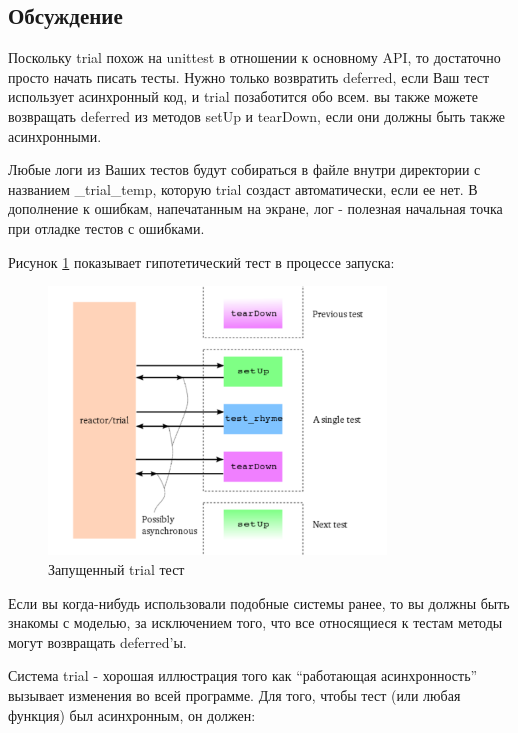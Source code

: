 \subsection{Обсуждение}

Поскольку trial похож на unittest в отношении 
к основному API, то достаточно просто начать писать тесты. 
Нужно только возвратить deferred, если Ваш тест использует 
асинхронный код, и trial позаботится обо всем. вы также можете 
возвращать deferred из методов setUp и tearDown, если 
они должны быть также асинхронными. 


Любые логи из Ваших тестов будут собираться в файле 
внутри директории с названием \_trial\_temp, 
которую trial создаст автоматически, если ее нет. 
В дополнение к ошибкам, напечатанным на экране, 
лог - полезная начальная точка при отладке тестов с ошибками. 

Рисунок \ref{fig:test-1} показывает гипотетический тест в 
процессе запуска:

\begin{figure}[h]
\begin{center}
    \includegraphics[width=0.8\textwidth]{images/test-1.pdf}
    \caption{Запущенный trial тест\label{fig:test-1}}
\end{center}
\end{figure}


Если вы когда-нибудь использовали подобные системы ранее, 
то вы должны быть знакомы с моделью, за исключением того, что 
все относящиеся к тестам методы могут возвращать deferred'ы.

Система trial - хорошая иллюстрация того как 
``работающая асинхронность'' вызывает изменения во всей программе. 
Для того, чтобы тест (или любая функция) был асинхронным, он должен:

